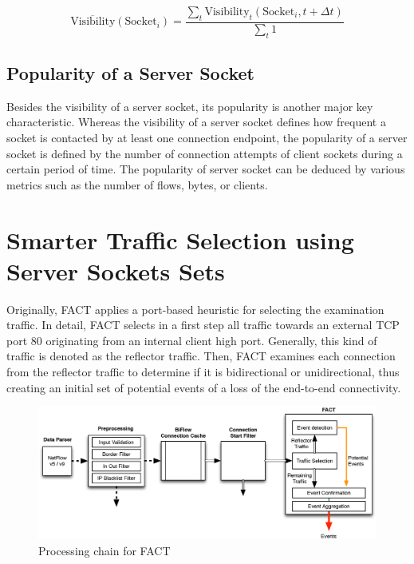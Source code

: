 \begin{equation}
	\overline{\text{Visibility}}(\text{Socket}_i) = \frac{\sum_{t} \text{Visibility}_t(\text{Socket}_i,t+\Delta{t})}{\sum_{t}1}
	\label{eq:visibility_avg}
\end{equation}

\subsection{Popularity of a Server Socket}

Besides the visibility of a \gls{server socket}, its popularity is another major key characteristic. 
Whereas the visibility of a \gls{server socket} defines how frequent a socket is contacted by at least one connection endpoint, the popularity of a \gls{server socket} is defined by the number of connection attempts of client sockets during a certain period of time. 
The popularity of \gls{server socket} can be deduced by various metrics such as the number of flows, bytes, or clients.

\newpage
\section{Smarter Traffic Selection using Server Sockets Sets 
\label{section:ses_traffic_selection}}

Originally, \gls{FACT} applies a port-based heuristic for selecting the  examination traffic.  
In detail, \gls{FACT} selects in a first step all traffic towards an external  \gls{TCP} port 80 originating from an internal client high port. 
Generally, this kind of traffic is denoted as the reflector traffic. 
Then, \gls{FACT} examines each connection from the reflector traffic to determine if it is  bidirectional or unidirectional, thus creating an initial set of potential events of a loss of the end-to-end connectivity. 

\begin{figure}
	[!b] \centering
	\includegraphics[width=\linewidth]{images/FACT.eps}
	\caption{Processing chain for FACT} 
	\label{fig:fact_chain} 
\end{figure}

